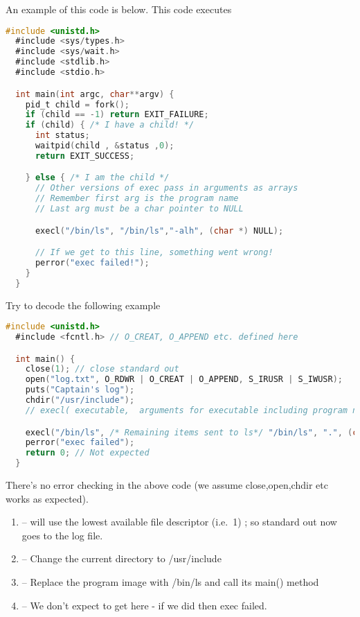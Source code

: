 An example of this code is below. This code executes 

\begin{lstlisting}[language=C]
  #include <unistd.h>
  #include <sys/types.h> 
  #include <sys/wait.h>
  #include <stdlib.h>
  #include <stdio.h>

  int main(int argc, char**argv) {
    pid_t child = fork();
    if (child == -1) return EXIT_FAILURE;
    if (child) { /* I have a child! */
      int status;
      waitpid(child , &status ,0);
      return EXIT_SUCCESS;

    } else { /* I am the child */
      // Other versions of exec pass in arguments as arrays
      // Remember first arg is the program name
      // Last arg must be a char pointer to NULL

      execl("/bin/ls", "/bin/ls","-alh", (char *) NULL);

      // If we get to this line, something went wrong!
      perror("exec failed!");
    }
  }
\end{lstlisting}

Try to decode the following example

\begin{lstlisting}[language=C]
  #include <unistd.h>
  #include <fcntl.h> // O_CREAT, O_APPEND etc. defined here

  int main() {
    close(1); // close standard out
    open("log.txt", O_RDWR | O_CREAT | O_APPEND, S_IRUSR | S_IWUSR);
    puts("Captain's log");
    chdir("/usr/include");
    // execl( executable,  arguments for executable including program name and NULL at the end)

    execl("/bin/ls", /* Remaining items sent to ls*/ "/bin/ls", ".", (char *) NULL); // "ls ."
    perror("exec failed");
    return 0; // Not expected
  }
\end{lstlisting}

There's no error checking in the above code (we assume close,open,chdir etc works as expected). 

\begin{enumerate}
\item {} -- will use the lowest available file descriptor (i.e.~1) ; so standard out now goes to the log file. 
\item {} -- Change the current directory to /usr/include 
\item {} -- Replace the program image with /bin/ls and call its main() method 
\item {} -- We don't expect to get here - if we did then exec failed.
\end{enumerate}

